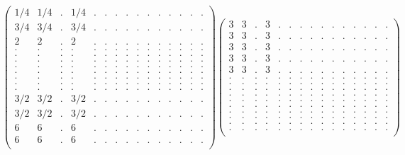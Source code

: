 \documentclass[12pt,a4paper]{amsart}
\begin{document}
\begin{align*}
\left(\begin{array}{rrrrrrrrrrrrrrr}%
1/4&1/4&.&1/4&.&.&.&.&.&.&.&.&.&.&.\\%
3/4&3/4&.&3/4&.&.&.&.&.&.&.&.&.&.&.\\%
2&2&.&2&.&.&.&.&.&.&.&.&.&.&.\\%
.&.&.&.&.&.&.&.&.&.&.&.&.&.&.\\%
.&.&.&.&.&.&.&.&.&.&.&.&.&.&.\\%
.&.&.&.&.&.&.&.&.&.&.&.&.&.&.\\%
.&.&.&.&.&.&.&.&.&.&.&.&.&.&.\\%
.&.&.&.&.&.&.&.&.&.&.&.&.&.&.\\%
.&.&.&.&.&.&.&.&.&.&.&.&.&.&.\\%
.&.&.&.&.&.&.&.&.&.&.&.&.&.&.\\%
.&.&.&.&.&.&.&.&.&.&.&.&.&.&.\\%
3/2&3/2&.&3/2&.&.&.&.&.&.&.&.&.&.&.\\%
3/2&3/2&.&3/2&.&.&.&.&.&.&.&.&.&.&.\\%
6&6&.&6&.&.&.&.&.&.&.&.&.&.&.\\%
6&6&.&6&.&.&.&.&.&.&.&.&.&.&.\\%
\end{array}\right)%
\left(\begin{array}{rrrrrrrrrrrrrrr}%
3&3&.&3&.&.&.&.&.&.&.&.&.&.&.\\%
3&3&.&3&.&.&.&.&.&.&.&.&.&.&.\\%
3&3&.&3&.&.&.&.&.&.&.&.&.&.&.\\%
3&3&.&3&.&.&.&.&.&.&.&.&.&.&.\\%
3&3&.&3&.&.&.&.&.&.&.&.&.&.&.\\%
.&.&.&.&.&.&.&.&.&.&.&.&.&.&.\\%
.&.&.&.&.&.&.&.&.&.&.&.&.&.&.\\%
.&.&.&.&.&.&.&.&.&.&.&.&.&.&.\\%
.&.&.&.&.&.&.&.&.&.&.&.&.&.&.\\%
.&.&.&.&.&.&.&.&.&.&.&.&.&.&.\\%
.&.&.&.&.&.&.&.&.&.&.&.&.&.&.\\%
.&.&.&.&.&.&.&.&.&.&.&.&.&.&.\\%
.&.&.&.&.&.&.&.&.&.&.&.&.&.&.\\%
.&.&.&.&.&.&.&.&.&.&.&.&.&.&.\\%
.&.&.&.&.&.&.&.&.&.&.&.&.&.&.\\%
\end{array}\right)%
\end{align*}
\end{document}
